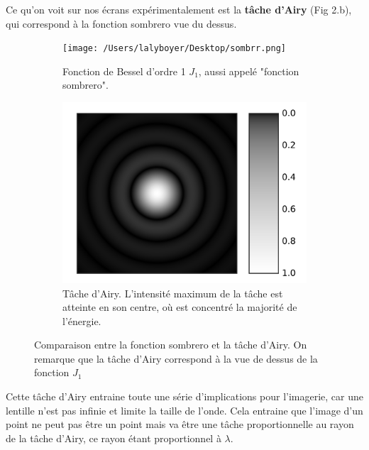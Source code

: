 Ce qu'on voit sur nos écrans expérimentalement est la \textbf{tâche d'Airy} (Fig 2.b), qui correspond à la fonction sombrero vue du dessus.

\begin{figure}[htbp]
    \centering
    \begin{subfigure}[b]{0.35\textwidth}
        \centering
        \texttt{[image: /Users/lalyboyer/Desktop/sombrr.png]}
        \caption{Fonction de Bessel d'ordre 1 $J_1$, aussi appelé "fonction sombrero".}
    \end{subfigure}
    \hspace*{3cm}
    \begin{subfigure}[b]{0.35\textwidth}
        \centering
        \includegraphics[width=\textwidth]{figures/airy_disk.png}
        \caption{Tâche d'Airy. L'intensité maximum de la tâche est atteinte en son centre, où est concentré la majorité de l'énergie.}
    \end{subfigure}
    \caption{Comparaison entre la fonction sombrero et la tâche d'Airy. On remarque que la tâche d'Airy correspond à la vue de dessus de la fonction $J_1$}
\end{figure}


Cette tâche d’Airy entraine toute une série d’implications pour l’imagerie, car une lentille n’est pas
infinie et limite la taille de l’onde. Cela entraine que l’image d’un point ne peut pas être un point mais
va être une tâche proportionnelle au rayon de la tâche d’Airy, ce rayon étant proportionnel à $\lambda$. %

